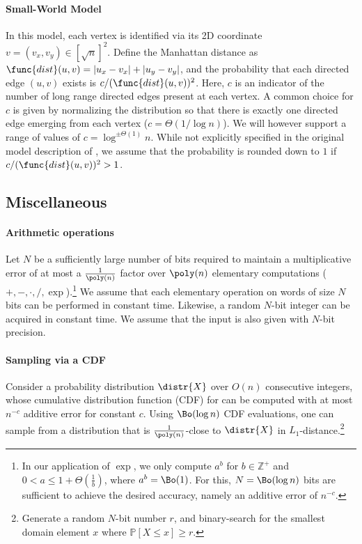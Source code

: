 \paragraph*{Small-World Model}
In this model, each vertex is identified via its 2D coordinate $v = (v_x, v_y) \in [\sqrt{n}]^2$.
Define the Manhattan distance as $\func{dist}(u,v)=|u_x-v_x|+|u_y-v_y|$,
and the probability that each directed edge $(u,v)$ exists is $c/(\func{dist}(u,v))^{2}$.
Here, $c$ is an indicator of the number of long range directed edges present at each vertex.
A common choice for $c$ is given by normalizing the distribution so that there is exactly one directed edge emerging from each vertex ($c = \Theta(1/\log n)$).
We will however support a range of values of $c=\log^{\pm\Theta(1)}n$.
While not explicitly specified in the original model description of \cite{kleinberg},
we assume that the probability is rounded down to $1$ if $c/(\func{dist}(u,v))^{2} > 1$.


\subsection{Miscellaneous}

\paragraph*{Arithmetic operations} Let $N$ be a sufficiently large number of bits required to maintain a multiplicative error of at most a $\frac{1}{\poly(n)}$ factor over $\poly(n)$ elementary computations ($+, -, \cdot, /, \exp$).\footnote{In our application of $\exp$, we only compute $a^b$ for $b \in \mathbb{Z}^+$ and $0 < a \leq 1+\Theta(\frac{1}{b})$, where $a^b = \Bo(1)$. For this, $N=\Bo(\log n)$ bits are sufficient to achieve the desired accuracy, namely an additive error of $n^{-c}$.} We assume that each elementary operation on words of size $N$ bits can be performed in constant time. Likewise, a random $N$-bit integer can be acquired in constant time. We assume that the input is also given with $N$-bit precision. %

\paragraph*{Sampling via a CDF}\label{para:CDF}
Consider a probability distribution $\distr{X}$ over $O(n)$ consecutive integers, whose cumulative distribution function (CDF) for can be computed with at most $n^{-c}$ additive error for constant $c$.
Using $\Bo(\log n)$ CDF evaluations, one can sample from a distribution that is
$\frac{1}{\poly(n)}$-close to $\distr{X}$ in $L_1$-distance.\footnote{Generate a random $N$-bit number $r$, and binary-search for the smallest domain element $x$ where $\mathbb P[X\leq x] \geq r$.}

